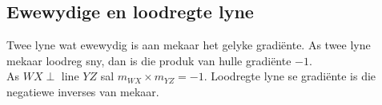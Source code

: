 \subsection*{Ewewydige en loodregte lyne}    
% 
Twee lyne wat ewewydig is aan mekaar het gelyke gradi\"ente. As twee lyne mekaar loodreg sny, dan is die produk van hulle gradi\"ente $-1$. \\

As $WX \perp $ line $ YZ$ sal $m_{WX} \times m_{YZ} = -1$. Loodregte lyne se gradi\"ente is die negatiewe inverses van mekaar.

\par
{}

